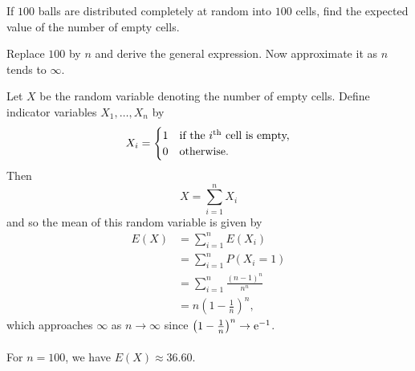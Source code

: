 \begin{problem}[Handout 1, \# 20]
  If \(100\) balls are distributed completely at random into \(100\) cells,
  find the expected value of the number of empty cells.

  \noindent Replace \(100\) by \(n\) and derive the general expression. Now
  approximate it as \(n\) tends to \(\infty\).
\end{problem}
\begin{solution*}
  Let \(X\) be the random variable denoting the number of empty
  cells. Define indicator variables \(X_1,\dotsc,X_n\) by
  \[
    X_i=
    \begin{cases}
      1&\text{if the \(i\)\textsuperscript{th} cell is empty,}\\
      0&\text{otherwise.}
    \end{cases}
  \]
  Then
  \[
    X=\sum_{i=1}^n X_i
  \]
  and so the mean of this random variable is given by
  \begin{align*}
    E(X)
    &=\sum_{i=1}^n E(X_i)\\
    &=\sum_{i=1}^n P(X_i=1)\\
    &=\sum_{i=1}^n\frac{(n-1)^n}{n^n}\\
    &=n\left(1-\frac{1}{n}\right)^n,
  \end{align*}
  which approaches \(\infty\) as \(n\to\infty\) since
  \(\bigl(1-\frac{1}{n}\bigr)^n\to \mathrm{e}^{-1}\).
  \\\\
  For \(n=100\), we have \(E(X)\approx 36.60\).
\end{solution*}

